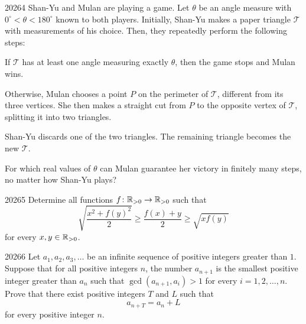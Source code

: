 \begin{problem}{2026}{4}
Shan-Yu and Mulan are playing a game. Let $\theta$ be an angle measure with $0^\circ<\theta<180^\circ$ known to both players. Initially, Shan-Yu makes a paper triangle $\mathcal{T}$ with measurements of his choice. Then, they repeatedly perform the following steps:
\begin{problemitems}
    \item If $\mathcal{T}$ has at least one angle measuring exactly $\theta$, then the game stops and Mulan wins.
    \item Otherwise, Mulan chooses a point $P$ on the perimeter of $\mathcal{T}$, different from its three vertices. She then makes a straight cut from $P$ to the opposite vertex of $\mathcal{T}$, splitting it into two triangles.
    \item Shan-Yu discards one of the two triangles. The remaining triangle becomes the new $\mathcal{T}$.
\end{problemitems}
For which real values of $\theta$ can Mulan guarantee her victory in finitely many steps, no matter how Shan-Yu plays?
\end{problem}

\begin{problem}{2026}{5}
Determine all functions $f\colon\mathbb{R}_{>0}\to\mathbb{R}_{>0}$ such that
\[
    \sqrt{\frac{x^2+f(y)^2}{2}}
    \geq\frac{f(x)+y}{2}
    \geq\sqrt{x f(y)}
\]
for every $x, y\in\mathbb{R}_{>0}$.
\end{problem}

\begin{problem}{2026}{6}
Let $a_1, a_2, a_3, \dots$ be an infinite sequence of positive integers greater than $1$. Suppose that for all positive integers $n$, the number $a_{n+1}$ is the smallest positive integer greater than $a_n$ such that $\gcd(a_{n+1}, a_i)>1$ for every $i=1, 2, \dots, n$. Prove that there exist positive integers $T$ and $L$ such that
\[
    a_{n+T}=a_n+L
\]
for every positive integer $n$.
\end{problem}

